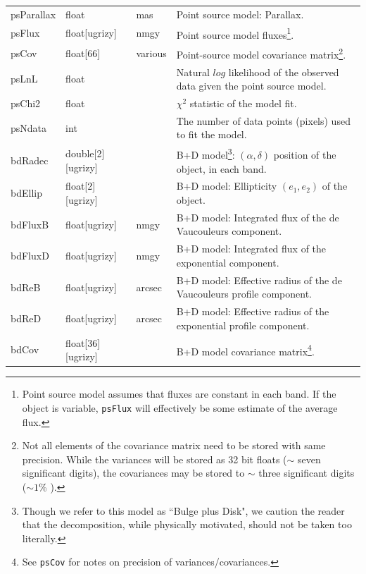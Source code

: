 \documentclass[12pt]{article}
\begin{document}
\begin{center}
\begin{longtable}{p{3cm}p{2cm}p{2cm}p{5cm}}
psParallax & float & mas & Point source model: Parallax. \\

psFlux & float[ugrizy] & nmgy & Point source model fluxes\footnote{Point source model assumes that fluxes are constant in each band. If the object is variable, {\tt psFlux} will effectively be some estimate of the average flux.}.\\

psCov & float[66] & various & Point-source model covariance matrix\footnote{Not all elements of the covariance matrix need to be stored with same precision. While the variances will be stored as 32 bit floats ($\sim$ seven significant digits), the covariances may be stored to $\sim$ three significant digits ($\sim 1$\% ).}. \\

psLnL & float & ~ & Natural $log$ likelihood of the observed data given the point source model. \\

psChi2 & float & ~ & $\chi^2$ statistic of the model fit. \\

psNdata & int & ~ & The number of data points (pixels) used to fit the model. \\


bdRadec & double[2][ugrizy] & ~ & B+D model\footnote{Though we refer to this model as ``Bulge plus Disk", we caution the reader that the decomposition, while physically motivated, should not be taken too literally.}: $(\alpha, \delta)$ position of the object, in each band. \\

bdEllip & float[2][ugrizy] & ~ & B+D model: Ellipticity $(e_1, e_2)$ of the object. \\

bdFluxB & float[ugrizy] & nmgy & B+D model: Integrated flux of the de Vaucouleurs component. \\

bdFluxD & float[ugrizy] & nmgy & B+D model: Integrated flux of the exponential component. \\

bdReB & float[ugrizy] & arcsec & B+D model: Effective radius of the de Vaucouleurs profile component. \\

bdReD & float[ugrizy] & arcsec & B+D model: Effective radius of the exponential profile component. \\

bdCov & float[36][ugrizy] & ~ & B+D model covariance matrix\footnote{See {\tt psCov} for notes on precision of variances/covariances.}. \\


\end{longtable}
\end{center}
\end{document}
